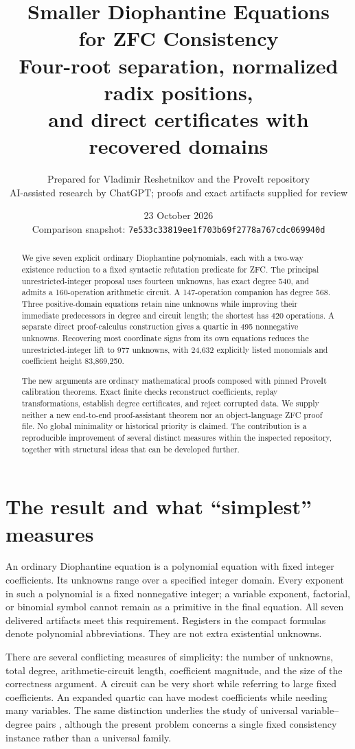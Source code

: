 \documentclass[11pt,a4paper]{article}
\title{\textbf{Smaller Diophantine Equations\\for ZFC Consistency}\\[5mm]
\large Four-root separation, normalized radix positions,\\and direct certificates with recovered domains}
\author{Prepared for Vladimir Reshetnikov and the ProveIt repository\\
\small AI-assisted research by ChatGPT; proofs and exact artifacts supplied for review}
\date{23 October 2026\\\small Comparison snapshot: \texttt{7e533c33819ee1f703b69f2778a767cdc069940d}}
\theoremstyle{definition}
\begin{document}
\maketitle
\begin{abstract}
We give seven explicit ordinary Diophantine polynomials, each with a
two-way existence reduction to a fixed syntactic refutation predicate for
ZFC. The principal unrestricted-integer proposal uses fourteen unknowns,
has exact degree 540, and admits a 160-operation arithmetic circuit. A
147-operation companion has degree 568. Three positive-domain equations
retain nine unknowns while improving their immediate predecessors in
degree and circuit length; the shortest has 420 operations. A separate
direct proof-calculus construction gives a quartic in 495 nonnegative
unknowns. Recovering most coordinate signs from its own equations reduces
the unrestricted-integer lift to 977 unknowns, with 24,632 explicitly
listed monomials and coefficient height 83,869,250.

The new arguments are ordinary mathematical proofs composed with pinned
ProveIt calibration theorems. Exact finite checks reconstruct coefficients,
replay transformations, establish degree certificates, and reject
corrupted data. We supply neither a new end-to-end proof-assistant theorem
nor an object-language ZFC proof file. No global minimality or historical
priority is claimed. The contribution is a reproducible improvement of
several distinct measures within the inspected repository, together with
structural ideas that can be developed further.
\end{abstract}

\clearpage
\tableofcontents
\clearpage

\section{The result and what ``simplest'' measures}
\label{sec:overview}

An ordinary Diophantine equation is a polynomial equation with fixed
integer coefficients. Its unknowns range over a specified integer domain.
Every exponent in such a polynomial is a fixed nonnegative integer; a
variable exponent, factorial, or binomial symbol cannot remain as a
primitive in the final equation. All seven delivered artifacts meet this
requirement. Registers in the compact formulas denote polynomial
abbreviations. They are not extra existential unknowns.

There are several conflicting measures of simplicity: the number of
unknowns, total degree, arithmetic-circuit length, coefficient magnitude,
and the size of the correctness argument. A circuit can be very short
while referring to large fixed coefficients. An expanded quartic can have
modest coefficients while needing many variables. The same distinction
underlies the study of universal variable--degree pairs
\cite{bayer}, although the present problem concerns a single fixed
consistency instance rather than a universal family.
\end{document}
